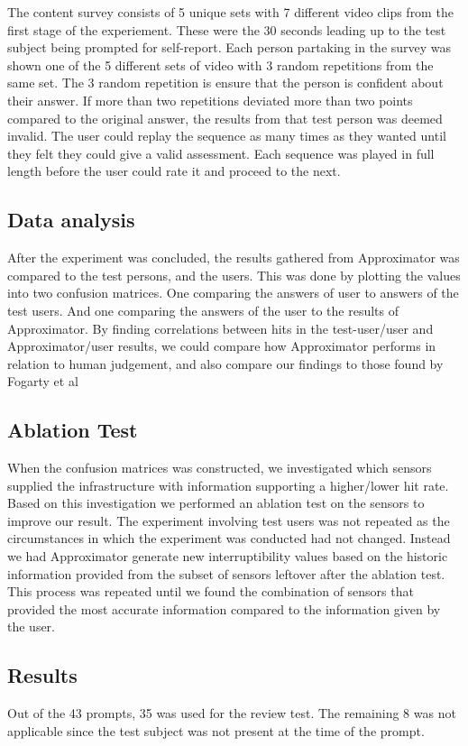 \documentclass{sigchi}
\begin{document}
The content survey consists of 5 unique sets with 7 different video clips from the first stage of the experiement.
These were the 30 seconds leading up to the test subject being prompted for self-report.
Each person partaking in the survey was shown one of the 5 different sets of video with 3 random repetitions from the same set.
The 3 random repetition is ensure that the person is confident about their answer.
If more than two repetitions deviated more than two points compared to the original answer, the results from that test person was deemed invalid.
The user could replay the sequence as many times as they wanted until they felt they could give a valid assessment.
Each sequence was played in full length before the user could rate it and proceed to the next.

\subsection{Data analysis}
After the experiment was concluded, the results gathered from Approximator was compared to the test persons, and the users.
This was done by plotting the values into two confusion matrices.
One comparing the answers of user to answers of the test users.
And one comparing the answers of the user to the results of Approximator.
By finding correlations between hits in the test-user/user and Approximator/user results, we could compare how Approximator performs in relation to human judgement, and also compare our findings to those found by Fogarty et al \cite{fogarty2005predicting}

\subsection{Ablation Test}
When the confusion matrices was constructed, we investigated which sensors supplied the infrastructure with information supporting a higher/lower hit rate.
Based on this investigation we performed an ablation test on the sensors to improve our result.
The experiment involving test users was not repeated as the circumstances in which the experiment was conducted had not changed.
Instead we had Approximator generate new interruptibility values based on the historic information provided from the subset of sensors leftover after the ablation test.
This process was repeated until we found the combination of sensors that provided the most accurate information compared to the information given by the user.

\subsection{Results}
Out of the 43 prompts, 35 was used for the review test.
The remaining 8 was not applicable since the test subject was not present at the time of the prompt.
\end{document}
